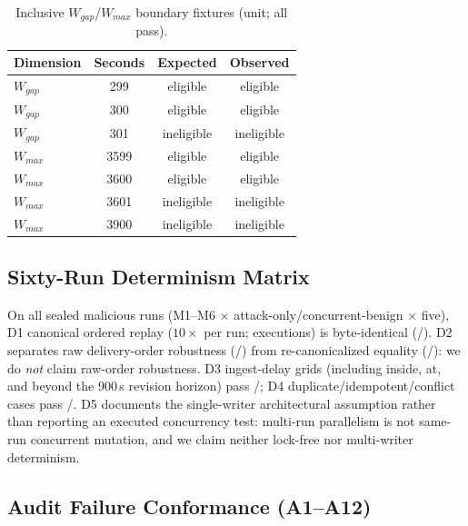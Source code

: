 \begin{table}[!t]
\caption{Inclusive $W_{gap}$/$W_{max}$ boundary fixtures (unit; all pass).}
\label{tab:boundary-fixtures}
\centering
\scriptsize
\begin{tabular}{@{}lccc@{}}
\toprule
\textbf{Dimension} & \textbf{Seconds} & \textbf{Expected} & \textbf{Observed} \\
\midrule
$W_{gap}$ & 299 & eligible & eligible \\
$W_{gap}$ & 300 & eligible & eligible \\
$W_{gap}$ & 301 & ineligible & ineligible \\
$W_{max}$ & 3599 & eligible & eligible \\
$W_{max}$ & 3600 & eligible & eligible \\
$W_{max}$ & 3601 & ineligible & ineligible \\
$W_{max}$ & 3900 & ineligible & ineligible \\
\bottomrule
\end{tabular}
\end{table}

\subsection{Sixty-Run Determinism Matrix}
\label{sec:replay}



On all \DetNRuns{} sealed malicious runs (M1--M6 $\times$ attack-only/concurrent-benign $\times$
five), D1 canonical ordered replay ($10\times$ per run; \DetDOneExec{} executions) is
byte-identical (\DetDOnePass{}/\DetNRuns{}). D2 separates raw delivery-order robustness
(\DetDTwoRawPass{}/\DetNRuns{}) from re-canonicalized equality
(\DetDTwoCanonPass{}/\DetNRuns{}): we do \emph{not} claim raw-order robustness. D3 ingest-delay
grids (including inside, at, and beyond the 900\,s revision horizon) pass
\DetDThreePass{}/\DetNRuns{}; D4 duplicate/idempotent/conflict cases pass
\DetDFourPass{}/\DetNRuns{}. D5 documents the single-writer architectural assumption rather than
reporting an executed concurrency test: multi-run parallelism is not same-run concurrent mutation, and
we claim neither lock-free nor multi-writer determinism.

\subsection{Audit Failure Conformance (A1--A12)}
\label{sec:audit-conformance}

